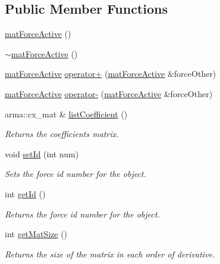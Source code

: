 \subsection*{Public Member Functions}
\begin{DoxyCompactItemize}
\item 
\hyperlink{classosea_1_1ofreq_1_1mat_force_active_addc507c90f98f3a9bb9bfe57897df3ca}{mat\-Force\-Active} ()
\item 
\hyperlink{classosea_1_1ofreq_1_1mat_force_active_aba1957829e2109f03c6fc03990258210}{$\sim$mat\-Force\-Active} ()
\item 
\hyperlink{classosea_1_1ofreq_1_1mat_force_active}{mat\-Force\-Active} \hyperlink{classosea_1_1ofreq_1_1mat_force_active_a8bc32fc773bd6c29d8bd7790194a10cf}{operator+} (\hyperlink{classosea_1_1ofreq_1_1mat_force_active}{mat\-Force\-Active} \&force\-Other)
\item 
\hyperlink{classosea_1_1ofreq_1_1mat_force_active}{mat\-Force\-Active} \hyperlink{classosea_1_1ofreq_1_1mat_force_active_a150bda87debf622dacb439e8e983fa3c}{operator-\/} (\hyperlink{classosea_1_1ofreq_1_1mat_force_active}{mat\-Force\-Active} \&force\-Other)
\item 
arma\-::cx\-\_\-mat \& \hyperlink{classosea_1_1ofreq_1_1mat_force_active_ab2cb4bbd11161f8c2944675815dea81c}{list\-Coefficient} ()
\begin{DoxyCompactList}\small\item\em Returns the coefficients matrix. \end{DoxyCompactList}\item 
void \hyperlink{classosea_1_1ofreq_1_1mat_force_active_a2784051c78388741bf1cf66d18df0b2c}{set\-Id} (int num)
\begin{DoxyCompactList}\small\item\em Sets the force id number for the object. \end{DoxyCompactList}\item 
int \hyperlink{classosea_1_1ofreq_1_1mat_force_active_a48a33b65af2085268a2f03fb212a39d3}{get\-Id} ()
\begin{DoxyCompactList}\small\item\em Returns the force id number for the object. \end{DoxyCompactList}\item 
int \hyperlink{classosea_1_1ofreq_1_1mat_force_active_aa17a21eb9a9ea9e1a36fae4dbc2b09bf}{get\-Mat\-Size} ()
\begin{DoxyCompactList}\small\item\em Returns the size of the matrix in each order of derivative. \end{DoxyCompactList}\end{DoxyCompactItemize}
